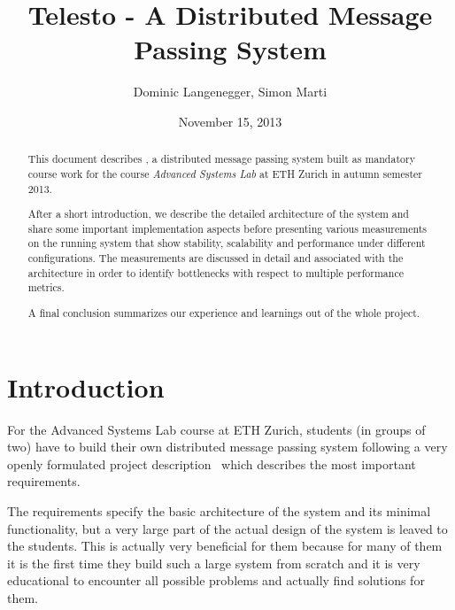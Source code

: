\documentclass[a4paper, oneside]{csthesis}
\title{Telesto - A Distributed Message Passing System}
\author{Dominic Langenegger, Simon Marti}
\institute{Advanced Systems Lab 2013 \\[2pt]
Systems Group \\[2pt]
ETH Z\"urich}
\date{November 15, 2013}
\begin{document}
\frontmatter
\maketitle %

\cleardoublepage



\begin{abstract}
	This document describes \telesto, a distributed message passing system
	built as mandatory course work for the course {\it Advanced Systems Lab} at ETH
	Zurich in autumn semester 2013.
	
    After a short introduction, we describe the detailed architecture of the
    system and share some important implementation aspects before presenting
    various measurements on the running system that show stability, scalability
    and performance under different configurations. The measurements are
    discussed in detail and associated with the architecture in order to
    identify bottlenecks with respect to multiple performance metrics.
    
    A final conclusion summarizes our experience and learnings out of the whole
    project.

\end{abstract}

\tableofcontents

\mainmatter %

\chapter{Introduction}
	For the Advanced Systems Lab course at ETH Zurich, students (in groups of two)
	have to build their own distributed message passing system following a very
	openly formulated project description~\cite{asl:course-description} which
	describes the most important requirements.
	
	The requirements specify the basic architecture of the system and its
	minimal functionality, but a very large part of the actual design of the system
	is leaved to the students. This is actually very beneficial for them because for
	many of them it is the first time they build such a large system from scratch
	and it is very educational to encounter all possible problems and actually find
	solutions for them.
	
\end{document}

